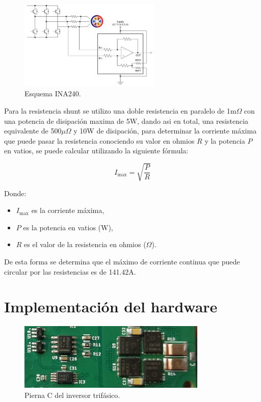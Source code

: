 \documentclass[11pt]{report}
\begin{document}
\begin{figure}[ht]
	\centering
	\includegraphics[width=0.6\textwidth]{imagenes/Diagramas/INA240.png}
	\caption{Esquema INA240.}
	\label{INA240}
\end{figure}
\FloatBarrier

Para la resistencia shunt se utilizo una doble resistencia en paralelo de 1m$\Omega$ con una potencia de disipación maxima de 5W, dando asi en total, una resistencia equivalente de 500$\mu\Omega$ y 10W de disipación, para determinar la corriente máxima que puede pasar la resistencia conociendo su valor en ohmios \( R \) y la potencia \( P \) en vatios, se puede calcular utilizando la siguiente fórmula:

\[
	I_{\text{max}} = \sqrt{\frac{P}{R}}
\]

Donde:
\begin{itemize}
	\item \( I_{\text{max}} \) es la corriente máxima,
	\item \( P \) es la potencia en vatios (W),
	\item \( R \) es el valor de la resistencia en ohmios ($\Omega$).
\end{itemize}

De esta forma se determina que el máximo de corriente continua que puede circular por las resistencias es de 141.42A.

\newpage
\section{Implementación del hardware}



\begin{figure}[ht]
	\centering
	\includegraphics[width=0.8\textwidth]{imagenes/PCB/FULL_Pierna_C.jpg}
	\caption{Pierna C del inversor trifásico.}
	\label{pierna_C}
\end{figure}
\FloatBarrier
\end{document}
